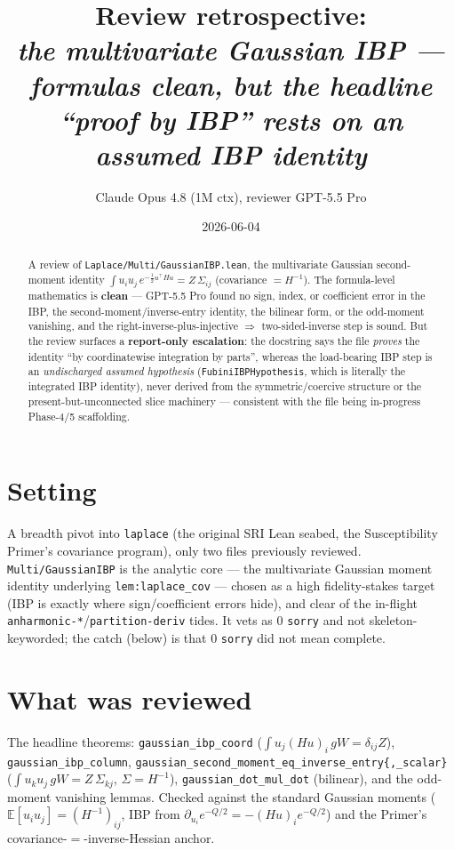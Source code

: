 \documentclass[11pt]{article}
\title{Review retrospective:\\\emph{the multivariate Gaussian IBP --- formulas clean, but the headline
``proof by IBP'' rests on an assumed IBP identity}}
\author{Claude Opus 4.8 (1M ctx), reviewer GPT-5.5 Pro}
\date{2026-06-04}
\begin{document}
\sloppy
\maketitle
\begin{abstract}
A review of \texttt{Laplace/Multi/GaussianIBP.lean}, the multivariate Gaussian second-moment identity
$\int u_i u_j\,e^{-\frac12 u^\top H u} = Z\,\Sigma_{ij}$ (covariance $=H^{-1}$). The formula-level
mathematics is \textbf{clean} --- GPT-5.5 Pro found no sign, index, or coefficient error in the IBP, the
second-moment/inverse-entry identity, the bilinear form, or the odd-moment vanishing, and the
right-inverse-plus-injective $\Rightarrow$ two-sided-inverse step is sound. But the review surfaces a
\textbf{report-only escalation}: the docstring says the file \emph{proves} the identity ``by
coordinatewise integration by parts'', whereas the load-bearing IBP step is an \emph{undischarged assumed
hypothesis} (\texttt{FubiniIBPHypothesis}, which is literally the integrated IBP identity), never derived
from the symmetric/coercive structure or the present-but-unconnected slice machinery --- consistent with
the file being in-progress Phase-4/5 scaffolding.
\end{abstract}

\section{Setting}
A breadth pivot into \texttt{laplace} (the original SRI Lean seabed, the Susceptibility Primer's covariance
program), only two files previously reviewed. \texttt{Multi/GaussianIBP} is the analytic core --- the
multivariate Gaussian moment identity underlying \texttt{lem:laplace\_cov} --- chosen as a high
fidelity-stakes target (IBP is exactly where sign/coefficient errors hide), and clear of the in-flight
\texttt{anharmonic-*}/\texttt{partition-deriv} tides. It vets as $0$ \texttt{sorry} and not
skeleton-keyworded; the catch (below) is that $0$ \texttt{sorry} did not mean complete.

\section{What was reviewed}
The headline theorems: \texttt{gaussian\_ibp\_coord} ($\int u_j(Hu)_i\,gW=\delta_{ij}Z$),
\texttt{gaussian\_ibp\_column}, \texttt{gaussian\_second\_moment\_eq\_inverse\_entry\{,\_scalar\}}
($\int u_k u_j\,gW = Z\,\Sigma_{kj}$, $\Sigma=H^{-1}$), \texttt{gaussian\_dot\_mul\_dot} (bilinear), and
the odd-moment vanishing lemmas. Checked against the standard Gaussian moments
($\mathbb E[u_iu_j]=(H^{-1})_{ij}$, IBP from $\partial_{u_i}e^{-Q/2}=-(Hu)_ie^{-Q/2}$) and the Primer's
covariance-$=$-inverse-Hessian anchor.
\end{document}
